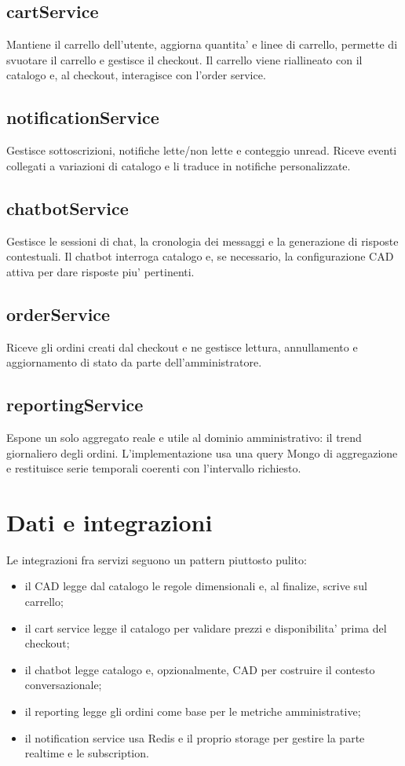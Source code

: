 \subsection{cartService}
Mantiene il carrello dell'utente, aggiorna quantita' e linee di carrello, permette di svuotare il carrello e gestisce il checkout. Il carrello viene riallineato con il catalogo e, al checkout, interagisce con l'order service.

\subsection{notificationService}
Gestisce sottoscrizioni, notifiche lette/non lette e conteggio unread. Riceve eventi collegati a variazioni di catalogo e li traduce in notifiche personalizzate.

\subsection{chatbotService}
Gestisce le sessioni di chat, la cronologia dei messaggi e la generazione di risposte contestuali. Il chatbot interroga catalogo e, se necessario, la configurazione CAD attiva per dare risposte piu' pertinenti.

\subsection{orderService}
Riceve gli ordini creati dal checkout e ne gestisce lettura, annullamento e aggiornamento di stato da parte dell'amministratore.

\subsection{reportingService}
Espone un solo aggregato reale e utile al dominio amministrativo: il trend giornaliero degli ordini. L'implementazione usa una query Mongo di aggregazione e restituisce serie temporali coerenti con l'intervallo richiesto.

\section{Dati e integrazioni}

Le integrazioni fra servizi seguono un pattern piuttosto pulito:

\begin{itemize}
\item il CAD legge dal catalogo le regole dimensionali e, al finalize, scrive sul carrello;
\item il cart service legge il catalogo per validare prezzi e disponibilita' prima del checkout;
\item il chatbot legge catalogo e, opzionalmente, CAD per costruire il contesto conversazionale;
\item il reporting legge gli ordini come base per le metriche amministrative;
\item il notification service usa Redis e il proprio storage per gestire la parte realtime e le subscription.
\end{itemize}

